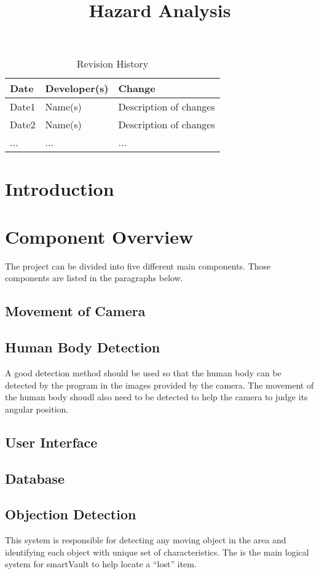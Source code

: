 \documentclass{article}
\title{Hazard Analysis\\\progname}
\author{\authname}
\date{}
\begin{document}
\begin{table}[hp]
\caption{Revision History} \label{TblRevisionHistory}
\begin{tabularx}{\textwidth}{llX}
\toprule
\textbf{Date} & \textbf{Developer(s)} & \textbf{Change}\\
\midrule
Date1 & Name(s) & Description of changes\\
Date2 & Name(s) & Description of changes\\
... & ... & ...\\
\bottomrule
\end{tabularx}
\end{table}

\newpage

\maketitle

\newpage


\tableofcontents

\newpage
\section{Introduction}

\section{Component Overview}
The project can be divided into five different main components. Those components are listed in the paragraphs below. 
\subsection{Movement of Camera}
\subsection{Human Body Detection}
A good detection method should be used so that the human body can be detected by the program in the images provided by the camera. The movement of the human body shoudl also need to be detected to help the camera to judge its angular position. 
\subsection{User Interface}
\subsection{Database}
\subsection{Objection Detection}
This system is responsible for detecting any moving object in the area and identifying each object with unique set of characteristics. The is the main logical system for smartVault to help locate a “lost” item. 
\end{document}

